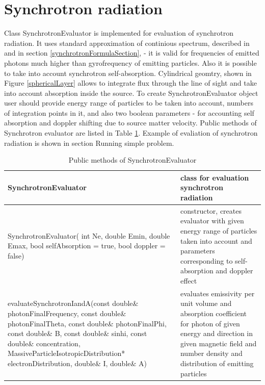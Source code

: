 \section{Synchrotron radiation}\label{synchrotronSection}
Class SynchrotronEvaluator is implemented for evaluation of synchrotron radiation. It uses standard approximation of continious spectrum, described in \cite{Ginzburg1975, Ghisellini} and in section \ref{synchrotronFormulaSection},  - it is valid for frequencies of emitted photons much higher than gyrofrequency of emitting particles. Also it is possible to take into account synchrotron self-absorption. Cylindrical geomtry, shown in Figure \ref{sphericalLayer} allows to integrate flux through the line of sight and take into account absorption inside the source. To create SynchrotronEvaluator object user should provide energy range of particles to be taken into account, numbers of integration points in it, and also two boolean parameters - for accounting self absorption and doppler shifting due to source matter velocity. Public methods of Synchrotron evaluator are listed in Table  \ref{SynchrotronEvaluator}. Example of evaliation of synchrotron radiation is shown in section Running simple problem.
\begin{table}[h]
	\begin{center}
	\begin{small}
	\caption{Public methods of SynchrotronEvaluator}
	\label{SynchrotronEvaluator}
	\begin{tabularx}{\textwidth}{|X|X|} 
		\hline
		\textbf{SynchrotronEvaluator} & class for evaluation synchrotron radiation\\
		\hline
		SynchrotronEvaluator( int Ne, double Emin, double Emax, bool selfAbsorption = true, bool doppler = false) & constructor, creates evaluator with given energy range of particles taken into account and parameters corresponding to self-absorption and doppler effect\\
		\hline
		evaluateSynchrotronIandA(const double\& photonFinalFrequency, const double\& photonFinalTheta, const double\& photonFinalPhi, const double\& B, const double\& sinhi, const double\& concentration, MassiveParticleIsotropicDistribution* electronDistribution, double\& I, double\& A) & evaluates emissivity per unit volume and absorption coefficient for photon of given energy and direction in given magnetic field and number density and distribution of emitting particles\\
		\hline
	\end{tabularx}
\end{small}
\end{center}
\end{table}
